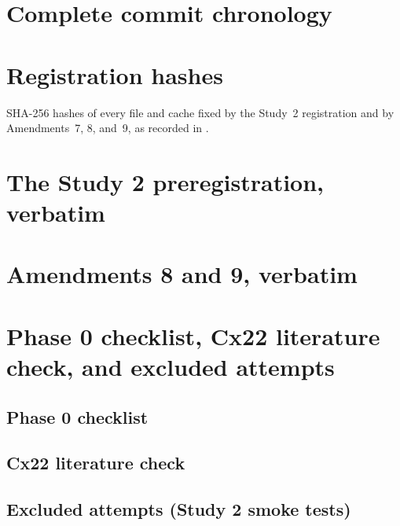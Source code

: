 

\chapter{Complete commit chronology}
\label{r:app:git}



\chapter{Registration hashes}
\label{r:app:hashes}

SHA-256 hashes of every file and cache fixed by the Study~2 registration and by Amendments~7, 8, and~9, as recorded in
.



\chapter{The Study 2 preregistration, verbatim}
\label{r:app:prereg}



\chapter{Amendments 8 and 9, verbatim}
\label{r:app:a8}



\chapter{Phase 0 checklist, Cx22 literature check, and excluded attempts}
\label{r:app:phase0}

\section{Phase 0 checklist}

\section{Cx22 literature check}

\section{Excluded attempts (Study 2 smoke tests)}


